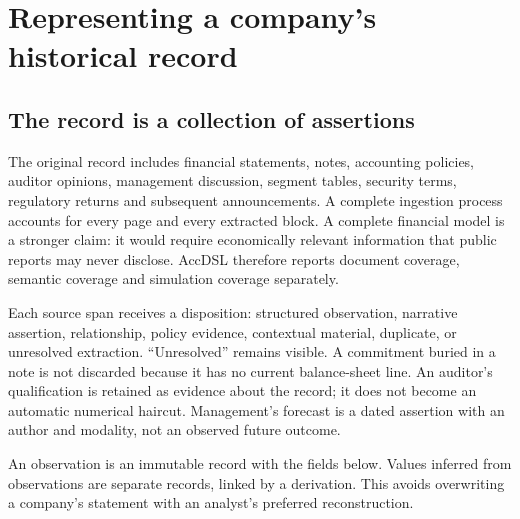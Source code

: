 \chapter{Representing a company's historical record}
\label{ch:history}

\section{The record is a collection of assertions}

The original record includes financial statements, notes, accounting policies,
auditor opinions, management discussion, segment tables, security terms,
regulatory returns and subsequent announcements. A complete ingestion process
accounts for every page and every extracted block. A complete financial model
is a stronger claim: it would require economically relevant information that
public reports may never disclose. AccDSL therefore reports document coverage,
semantic coverage and simulation coverage separately.

Each source span receives a disposition: structured observation, narrative
assertion, relationship, policy evidence, contextual material, duplicate, or
unresolved extraction. ``Unresolved'' remains visible. A commitment buried in a
note is not discarded because it has no current balance-sheet line. An auditor's
qualification is retained as evidence about the record; it does not become an
automatic numerical haircut. Management's forecast is a dated assertion with
an author and modality, not an observed future outcome.

An observation is an immutable record with the fields below. Values inferred
from observations are separate records, linked by a derivation. This avoids
overwriting a company's statement with an analyst's preferred reconstruction.

